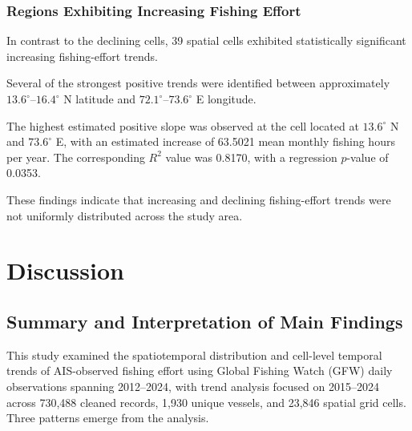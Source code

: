 \documentclass[pdflatex,sn-mathphys-num]{sn-jnl}
\theoremstyle{thmstyleone}
\theoremstyle{thmstyletwo}
\theoremstyle{thmstylethree}
\begin{document}
\subsubsection{Regions Exhibiting Increasing Fishing Effort}

In contrast to the declining cells, 39 spatial
cells exhibited statistically significant
increasing fishing-effort trends.

Several of the strongest positive trends were
identified between approximately
$13.6^\circ$--$16.4^\circ$ N latitude and
$72.1^\circ$--$73.6^\circ$ E longitude.

The highest estimated positive slope was
observed at the cell located at
$13.6^\circ$ N and $73.6^\circ$ E, with
an estimated increase of 63.5021 mean
monthly fishing hours per year. The
corresponding $R^2$ value was 0.8170,
with a regression $p$-value of 0.0353.

These findings indicate that increasing and
declining fishing-effort trends were not
uniformly distributed across the study area.

\FloatBarrier





\section{Discussion}\label{sec:discussion}

\subsection{Summary and Interpretation of Main Findings}\label{subsec:disc-findings}

This study examined the spatiotemporal distribution and cell-level temporal trends of AIS-observed fishing effort using Global Fishing Watch (GFW) daily observations spanning 2012--2024, with trend analysis focused on 2015--2024 across 730,488 cleaned records, 1,930 unique vessels, and 23,846 spatial grid cells. Three patterns emerge from the analysis.
\end{document}
